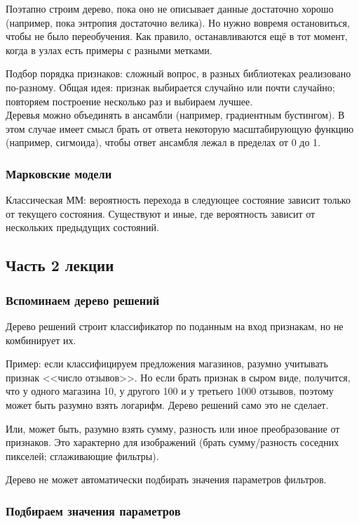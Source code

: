 \documentclass[main.tex]{subfiles}
\begin{document}
Поэтапно строим дерево, пока оно не описывает данные достаточно хорошо (например, пока энтропия достаточно велика).
Но нужно вовремя остановиться, чтобы не было переобучения.
Как правило, останавливаются ещё в тот момент, когда в узлах есть примеры с разными метками.

Подбор порядка признаков: сложный вопрос, в разных библиотеках реализовано по-разному.
Общая идея: признак выбирается случайно или почти случайно; повторяем построение несколько раз и выбираем лучшее. \\

Деревья можно объединять в ансамбли (например, градиентным бустингом).
В этом случае имеет смысл брать от ответа некоторую масштабирующую функцию (например, сигмоида), чтобы ответ ансамбля лежал в пределах от 0 до 1.

\subsubsection{Марковские модели}

Классическая ММ: вероятность перехода в следующее состояние зависит только от текущего состояния.
Существуют и иные, где вероятность зависит от нескольких предыдущих состояний.

\subsection{Часть 2 лекции}

\subsubsection{Вспоминаем дерево решений}

Дерево решений строит классификатор по поданным на вход признакам, но не комбинирует их.

Пример: если классифицируем предложения магазинов, разумно учитывать признак <<число отзывов>>.
Но если брать признак в сыром виде, получится, что у одного магазина 10, у другого 100 и у третьего 1000 отзывов, поэтому может быть разумно взять логарифм.
Дерево решений само это не сделает.

Или, может быть, разумно взять сумму, разность или иное преобразование от признаков.
Это характерно для изображений (брать сумму/разность соседних пикселей; сглаживающие фильтры).

Дерево не может автоматически подбирать значения параметров фильтров.

\subsubsection{Подбираем значения параметров}
\end{document}
